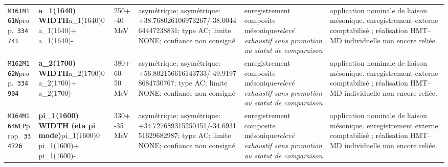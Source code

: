 \begin{landscape}
\begin{longtable}{L{1.85cm}L{4.45cm}L{2.35cm}L{4.05cm}L{3.35cm}L{7.15cm}}
\texttt{M161}\newline \texttt{M161W}\newline prop.\ \texttt{334741} & \textbf{a\_\allowbreak{}1(1640) WIDTH}\newline a\_\allowbreak{}1(1640)0 \textbar{}\allowbreak{} a\_\allowbreak{}1(1640)+ \textbar{}\allowbreak{} a\_\allowbreak{}1(1640)- & 250+-40\,MeV & asymétrique; asymétrique: +38.768026106973267/-38.004464447238831; type AC; limite NONE; confiance non consigné & enregistrement composite mésonique\newline \emph{relevé exhaustif sans promotion au statut de comparaison} & application nominale de liaison mésonique. enregistrement externe comptabilisé ; réalisation HMT--MD individuelle non encore reliée. \\
\texttt{M162}\newline \texttt{M162W}\newline prop.\ \texttt{334904} & \textbf{a\_\allowbreak{}2(1700) WIDTH}\newline a\_\allowbreak{}2(1700)0 \textbar{}\allowbreak{} a\_\allowbreak{}2(1700)+ \textbar{}\allowbreak{} a\_\allowbreak{}2(1700)- & 380+60-50\,MeV & asymétrique; asymétrique: +56.802156616143733/-49.91978684730767; type AC; limite NONE; confiance non consigné & enregistrement composite mésonique\newline \emph{relevé exhaustif sans promotion au statut de comparaison} & application nominale de liaison mésonique. enregistrement externe comptabilisé ; réalisation HMT--MD individuelle non encore reliée. \\
\texttt{M164}\newline \texttt{M164WEP}\newline prop.\ \texttt{334726} & \textbf{pi\_\allowbreak{}1(1600) WIDTH (eta pi mode)}\newline pi\_\allowbreak{}1(1600)0 \textbar{}\allowbreak{} pi\_\allowbreak{}1(1600)+ \textbar{}\allowbreak{} pi\_\allowbreak{}1(1600)- & 330+-35\,MeV & asymétrique; asymétrique: +34.727689315250451/-34.693151629682987; type AC; limite NONE; confiance non consigné & enregistrement composite mésonique\newline \emph{relevé exhaustif sans promotion au statut de comparaison} & application nominale de liaison mésonique. enregistrement externe comptabilisé ; réalisation HMT--MD individuelle non encore reliée. \\

\end{longtable}
\end{landscape}
